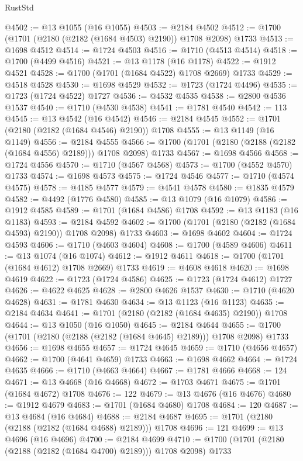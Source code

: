 \begin{lexlean}{RustStd}
\begin{coremodule}
@4502 := @13 @1055 (@16 @1055)
@4503 := @2184 @4502
@4512 := @1700 (@1701 (@2180 (@2182 (@1684 @4503) @2190)) @1708 @2098) @1733
@4513 := @1698 @4512
@4514 := @1724 @4503
@4516 := @1710 (@4513 @4514)
@4518 := @1700 (@4499 @4516)
@4521 := @13 @1178 (@16 @1178)
@4522 := @1912 @4521
@4528 := @1700 (@1701 (@1684 @4522) @1708 @2669) @1733
@4529 := @4518 @4528
@4530 := @1698 @4529
@4532 := @1723 (@1724 @4496)
@4535 := @1723 (@1724 @4522) @1727
@4536 := @4532 @4535
@4538 := @2800 @4536 @1537
@4540 := @1710 (@4530 @4538)
@4541 := @1781 @4540
@4542 := 113
@4545 := @13 @4542 (@16 @4542)
@4546 := @2184 @4545
@4552 := @1701 (@2180 (@2182 (@1684 @4546) @2190)) @1708
@4555 := @13 @1149 (@16 @1149)
@4556 := @2184 @4555
@4566 := @1700 (@1701 (@2180 (@2188 (@2182 (@1684 @4556) @2189))) @1708 @2098) @1733
@4567 := @1698 @4566
@4568 := @1724 @4556
@4570 := @1710 (@4567 @4568)
@4573 := @1700 (@4552 @4570) @1733
@4574 := @1698 @4573
@4575 := @1724 @4546
@4577 := @1710 (@4574 @4575)
@4578 := @4185 @4577
@4579 := @4541 @4578
@4580 := @1835 @4579
@4582 := @4492 (@1776 @4580)
@4585 := @13 @1079 (@16 @1079)
@4586 := @1912 @4585
@4589 := @1701 (@1684 @4586) @1708
@4592 := @13 @1183 (@16 @1183)
@4593 := @2184 @4592
@4602 := @1700 (@1701 (@2180 (@2182 (@1684 @4593) @2190)) @1708 @2098) @1733
@4603 := @1698 @4602
@4604 := @1724 @4593
@4606 := @1710 (@4603 @4604)
@4608 := @1700 (@4589 @4606)
@4611 := @13 @1074 (@16 @1074)
@4612 := @1912 @4611
@4618 := @1700 (@1701 (@1684 @4612) @1708 @2669) @1733
@4619 := @4608 @4618
@4620 := @1698 @4619
@4622 := @1723 (@1724 @4586)
@4625 := @1723 (@1724 @4612) @1727
@4626 := @4622 @4625
@4628 := @2800 @4626 @1537
@4630 := @1710 (@4620 @4628)
@4631 := @1781 @4630
@4634 := @13 @1123 (@16 @1123)
@4635 := @2184 @4634
@4641 := @1701 (@2180 (@2182 (@1684 @4635) @2190)) @1708
@4644 := @13 @1050 (@16 @1050)
@4645 := @2184 @4644
@4655 := @1700 (@1701 (@2180 (@2188 (@2182 (@1684 @4645) @2189))) @1708 @2098) @1733
@4656 := @1698 @4655
@4657 := @1724 @4645
@4659 := @1710 (@4656 @4657)
@4662 := @1700 (@4641 @4659) @1733
@4663 := @1698 @4662
@4664 := @1724 @4635
@4666 := @1710 (@4663 @4664)
@4667 := @1781 @4666
@4668 := 124
@4671 := @13 @4668 (@16 @4668)
@4672 := @1703 @4671
@4675 := @1701 (@1684 @4672) @1708
@4676 := 122
@4679 := @13 @4676 (@16 @4676)
@4680 := @1912 @4679
@4683 := @1701 (@1684 @4680) @1708
@4684 := 120
@4687 := @13 @4684 (@16 @4684)
@4688 := @2184 @4687
@4695 := @1701 (@2180 (@2188 (@2182 (@1684 @4688) @2189))) @1708
@4696 := 121
@4699 := @13 @4696 (@16 @4696)
@4700 := @2184 @4699
@4710 := @1700 (@1701 (@2180 (@2188 (@2182 (@1684 @4700) @2189))) @1708 @2098) @1733

\end{coremodule}
\end{lexlean}
